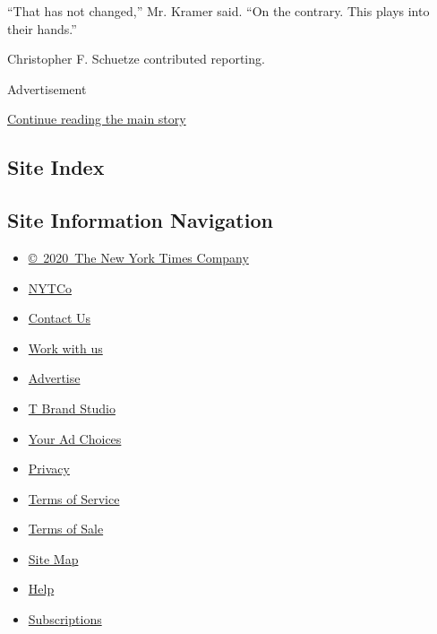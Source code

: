 ``That has not changed,'' Mr. Kramer said. ``On the contrary. This plays
into their hands.''

Christopher F. Schuetze contributed reporting.

Advertisement

\protect\hyperlink{after-bottom}{Continue reading the main story}

\hypertarget{site-index}{%
\subsection{Site Index}\label{site-index}}

\hypertarget{site-information-navigation}{%
\subsection{Site Information
Navigation}\label{site-information-navigation}}

\begin{itemize}
\tightlist
\item
  \href{https://help.nytimes.com/hc/en-us/articles/115014792127-Copyright-notice}{©~2020~The
  New York Times Company}
\end{itemize}

\begin{itemize}
\tightlist
\item
  \href{https://www.nytco.com/}{NYTCo}
\item
  \href{https://help.nytimes.com/hc/en-us/articles/115015385887-Contact-Us}{Contact
  Us}
\item
  \href{https://www.nytco.com/careers/}{Work with us}
\item
  \href{https://nytmediakit.com/}{Advertise}
\item
  \href{http://www.tbrandstudio.com/}{T Brand Studio}
\item
  \href{https://www.nytimes.com/privacy/cookie-policy\#how-do-i-manage-trackers}{Your
  Ad Choices}
\item
  \href{https://www.nytimes.com/privacy}{Privacy}
\item
  \href{https://help.nytimes.com/hc/en-us/articles/115014893428-Terms-of-service}{Terms
  of Service}
\item
  \href{https://help.nytimes.com/hc/en-us/articles/115014893968-Terms-of-sale}{Terms
  of Sale}
\item
  \href{https://spiderbites.nytimes.com}{Site Map}
\item
  \href{https://help.nytimes.com/hc/en-us}{Help}
\item
  \href{https://www.nytimes.com/subscription?campaignId=37WXW}{Subscriptions}
\end{itemize}
